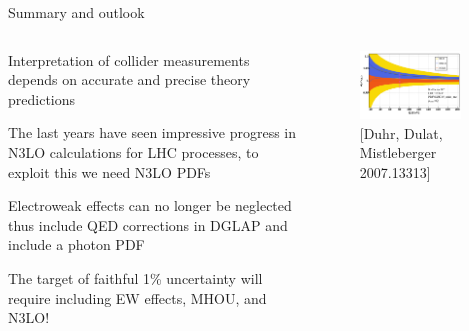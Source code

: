 \documentclass[aspectratio=169, 8pt,t]{beamer}
\begin{document}
\begin{frame}{Summary and outlook}

  \begin{columns}[T]
    \begin{column}{0.49\textwidth}
      \vspace*{1em}
      Interpretation of collider measurements depends on accurate and precise theory predictions
    
      \vspace*{1em}
      The last years have seen impressive progress in N3LO calculations for LHC processes, to exploit this we need N3LO PDFs
    
      \vspace*{1em}
      Electroweak effects can no longer be neglected thus include QED corrections in DGLAP and include a photon PDF
    
      \vspace*{1em}
      The target of faithful 1\% uncertainty will require including EW effects, MHOU, and N3LO!    
    \end{column}
    \begin{column}{0.49\textwidth}
      \begin{figure}
        \includegraphics[width=0.9\textwidth]{figures/n3lomistlberger.png}
        \caption*{\color{gray} [Duhr, Dulat, Mistleberger 2007.13313]}
      \end{figure}
    \end{column}
  \end{columns}

  \vspace*{2em}
\end{frame}
\end{document}
